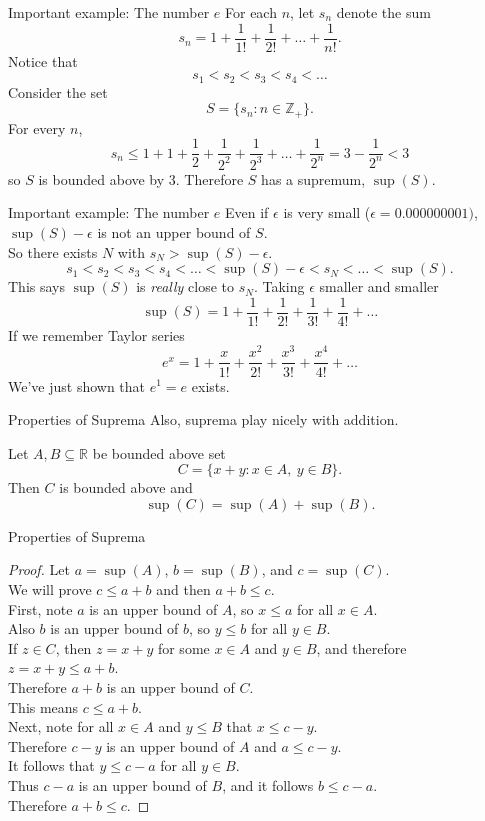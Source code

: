 \documentclass{beamer}
\begin{document}
\begin{frame}{Important example: The number $e$}
For each $n$, let $s_n$ denote the sum
$$s_n = 1 + \frac{1}{1!} + \frac{1}{2!} + \dots + \frac{1}{n!}.$$
\pause
Notice that
$$s_1 < s_2 < s_3 < s_4 < \dots$$
\pause
Consider the set
$$S = \{ s_n: n\in\mathbb{Z}_+\}.$$
\pause
For every $n$, 
$$s_n \leq 1 + 1 + \frac{1}{2} + \frac{1}{2^2} + \frac{1}{2^3} + \dots + \frac{1}{2^n} = 3 - \frac{1}{2^{n}} < 3$$
so $S$ is bounded above by $3$.
\pause
Therefore $S$ has a supremum, $\sup(S)$.
\end{frame}

\begin{frame}{Important example: The number $e$}
Even if $\epsilon$ is very small ($\epsilon = 0.000000001)$, $\sup(S)-\epsilon$ is not an upper bound of $S$.\\
\pause
So there exists $N$ with $s_N > \sup(S)-\epsilon$.
\pause
$$s_1 < s_2 < s_3 < s_4 < \dots < \sup(S)-\epsilon < s_N < \dots < \sup(S).$$
\pause
This says $\sup(S)$ is \emph{really} close to $s_N$.
\pause
Taking $\epsilon$ smaller and smaller
\pause
$$\sup(S) = 1 + \frac{1}{1!} + \frac{1}{2!} + \frac{1}{3!} + \frac{1}{4!}  + \dots$$
\pause
If we remember Taylor series
\pause
$$e^x = 1 + \frac{x}{1!} + \frac{x^2}{2!} + \frac{x^3}{3!} + \frac{x^4}{4!}  + \dots$$
\pause
We've just shown that $e^1=e$ exists.
\end{frame}


\begin{frame}{Properties of Suprema}
Also, suprema play nicely with addition.
\begin{thm}
Let $A,B\subseteq\mathbb{R}$ be bounded above set
$$C = \{x+y: x\in A,\ y\in B\}.$$
Then $C$ is bounded above and
$$\sup(C) = \sup(A) + \sup(B).$$
\end{thm}
\end{frame}
\begin{frame}{Properties of Suprema}
\begin{proof}
Let $a = \sup(A)$, $b = \sup(B)$, and $c=\sup(C)$. \\
\pause
We will prove $c \leq a+b$ and then $a+b\leq c$. \\
\pause
First, note $a$ is an upper bound of $A$, so $x\leq a$ for all $x\in A$. \\
\pause
Also $b$ is an upper bound of $b$, so $y\leq b$ for all $y\in B$. \\
\pause
If $z\in C$, then $z=x+y$ for some $x\in A$ and $y\in B$, and therefore $z = x+y \leq a+b$. \\
\pause
Therefore $a+b$ is an upper bound of $C$. \\
\pause
This means $c\leq a+b$. \\
\pause
Next, note for all $x\in A$ and $y\leq B$ that $x\leq c-y$. \\
\pause
Therefore $c-y$  is an upper bound of $A$ and $a\leq c-y$. \\
\pause
It follows that $y\leq c-a$ for all $y\in B$. \\
\pause
Thus $c-a$ is an upper bound of $B$, and it follows $b\leq c-a$. \\
\pause
Therefore $a+b\leq c$.
\end{proof}
\end{frame}
\end{document}
